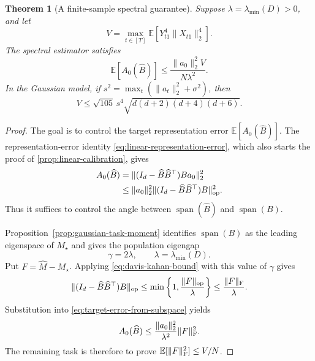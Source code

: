 \documentclass[11pt,twoside]{article}
\newcommand{\E}{\mathbb E}
\newtheorem{theorem}{Theorem}[section]
\theoremstyle{definition}
\theoremstyle{remark}
\begin{document}
\begin{theorem}[A finite-sample spectral guarantee]
\label{thm:spectral-guarantee}
Suppose $\lambda=\lambda_{\min}(D)>0$, and let
\[
 V=\max_{t\in[T]}\E[Y_{t1}^4\|X_{t1}\|_2^4].
\]
The spectral estimator satisfies
\begin{equation}
 \E[A_0(\widehat B)]
 \le\frac{\|a_0\|_2^2 V}{N\lambda^2}.
 \label{eq:spectral-target-bound}
\end{equation}
In the Gaussian model, if
$s^2=\max_t(\|a_t\|_2^2+\sigma^2)$, then
\[
 V\le\sqrt{105}\,s^4\sqrt{d(d+2)(d+4)(d+6)}.
\]
\end{theorem}

\begin{proof}
The goal is to control the target representation error
$\E[A_0(\widehat B)]$. The representation-error identity
\cref{eq:linear-representation-error}, which also starts the proof of
\cref{prop:linear-calibration}, gives
\begin{align}
 A_0(\widehat B)
 &=\|(I_d-\widehat B\widehat B^\top)Ba_0\|_2^2 \notag\\
 &\le
 \|a_0\|_2^2
 \|(I_d-\widehat B\widehat B^\top)B\|_{\rm op}^2.
 \label{eq:target-error-from-subspace}
\end{align}
Thus it suffices to control the angle between
$\operatorname{span}(\widehat B)$ and $\operatorname{span}(B)$.

Proposition~\ref{prop:gaussian-task-moment} identifies
$\operatorname{span}(B)$ as the leading eigenspace of $M_\star$ and gives
the population eigengap
\[
 \gamma=2\lambda,\qquad \lambda=\lambda_{\min}(D).
\]
Put $F=\widehat M-M_\star$. Applying
\cref{eq:davis-kahan-bound} with this value of $\gamma$ gives
\[
 \|(I_d-\widehat B\widehat B^\top)B\|_{\rm op}
 \le
 \min\left\{1,\frac{\|F\|_{\rm op}}{\lambda}\right\}
 \le\frac{\|F\|_{\rm F}}{\lambda}.
\]
Substitution into \cref{eq:target-error-from-subspace} yields
\begin{equation}
 A_0(\widehat B)
 \le\frac{\|a_0\|_2^2}{\lambda^2}\|F\|_{\rm F}^2.
 \label{eq:target-error-from-moment}
\end{equation}
The remaining task is therefore to prove
$\E[\|F\|_{\rm F}^2]\le V/N$.


\end{proof}
\end{document}
